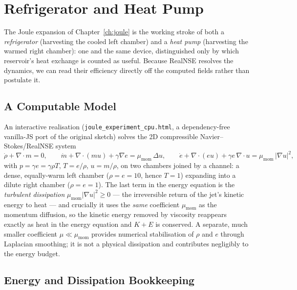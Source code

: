 \chapter{Refrigerator and Heat Pump}\label{ch:refrig}

The Joule expansion of Chapter~\ref{ch:joule} is the working stroke of both a
\emph{refrigerator} (harvesting the cooled left chamber) and a \emph{heat pump}
(harvesting the warmed right chamber): one and the same device, distinguished
only by which reservoir's heat exchange is counted as useful. Because RealNSE
resolves the dynamics, we can read their efficiency directly off the computed
fields rather than postulate it.

\section{A Computable Model}

An interactive realisation (\texttt{joule\_experiment\_cpu.html}, a
dependency-free vanilla-JS port of the original sketch) solves the 2D
compressible Navier--Stokes/RealNSE system
\[
\dot\rho+\nabla\cdot m=0,\qquad
\dot m+\nabla\cdot(mu)+\gamma\nabla e=\mu_{\mathrm{mom}}\,\Delta u,\qquad
\dot e+\nabla\cdot(eu)+\gamma e\,\nabla\cdot u=\mu_{\mathrm{mom}}\,|\nabla u|^2,
\]
with $p=\gamma e=\gamma\rho T$, $T=e/\rho$, $u=m/\rho$, on two chambers joined by a
channel: a dense, equally-warm left chamber ($\rho=e=10$, hence $T=1$) expanding
into a dilute right chamber ($\rho=e=1$). The last term in the energy equation is
the \emph{turbulent dissipation} $\mu_{\mathrm{mom}}|\nabla u|^2\ge 0$ --- the
irreversible return of the jet's kinetic energy to heat --- and crucially it uses
the \emph{same} coefficient $\mu_{\mathrm{mom}}$ as the momentum diffusion, so the
kinetic energy removed by viscosity reappears exactly as heat in the energy
equation and $K+E$ is conserved. A separate, much smaller coefficient
$\mu\ll\mu_{\mathrm{mom}}$ provides numerical stabilisation of $\rho$ and $e$
through Laplacian smoothing; it is not a physical dissipation and contributes
negligibly to the energy budget.

\section{Energy and Dissipation Bookkeeping}

